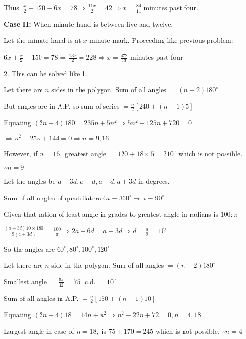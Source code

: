        Thus, $\frac{x}{2} + 120 - 6x = 78 \Rightarrow \frac{11x}{2} = 42 \Rightarrow x = \frac{84}{11}$ minutes past four.

       {\bf Case II:} When minute hand is between five and twelve.

       Let the minute hand is at $x$ minute mark. Proceeding like previous problem:

       $6x + \frac{x}{2} - 150 = 78 \Rightarrow \frac{13x}{2} = 228 \Rightarrow x = \frac{472}{13}$ minutes past four.

    2. This can be solved like 1.

\item Let there are $n$ sides in the polygon. Sum of all angles $= (n - 2)180^\circ$

    But angles are in A.P. so sum of series $= \frac{n}{2}[240 + (n - 1)5]$

    Equating $(2n - 4)180 = 235n + 5n^2 \Rightarrow 5n^2 - 125n + 720 = 0$

    $\Rightarrow n^2 - 25n + 144 = 0 \Rightarrow n = 9, 16$

    However, if $n = 16,$ greatest angle $= 120 + 18\times 5 = 210^\circ$ which is not possible.

    $\therefore n = 9$

\item Let the angles be $a - 3d, a - d, a + d, a + 3d$ in degrees.

    Sum of all angles of quadrilaters $4a = 360^\circ \Rightarrow a = 90^\circ$

    Given that ration of least angle in grades to greatest angle in radians is $100:\pi$

    $\frac{(a - 3d)10\times 180}{9(a + 3d)} = \frac{100}{\pi} \Rightarrow 2a - 6d = a + 3d \Rightarrow d = \frac{a}{9} = 10^\circ$

    So the angles are $60^\circ, 80^\circ, 100^\circ, 120^\circ$

\item Let there are $n$ side in the polygon. Sum of all angles $= (n - 2)180^\circ$

    Smallest angle $= \frac{5\pi}{12} = 75^\circ$ c.d. $= 10^\circ$

    Sum of all angles in A.P. $= \frac{n}{2}[150 + (n - 1)10]$

    Equating $(2n - 4)18 = 14n + n^2 \Rightarrow n^2 - 22n + 72 = 0, n = 4, 18$

    Largest angle in case of $n = 18,$ is $75 + 170 = 245$ which is not possible. $\therefore n = 4$

